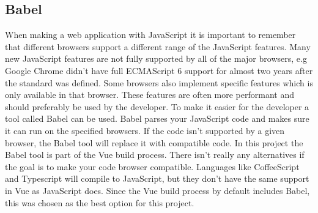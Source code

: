 \subsection{Babel}
When making a web application with JavaScript it is important to remember that different browsers support a different range of the JavaScript features. Many new JavaScript features are not fully supported by all of the major browsers, e.g Google Chrome didn't have full ECMAScript 6 support for almost two years after the standard was defined. Some browsers also implement specific features which is only available in that browser. These features are often more performant and should preferably be used by the developer. To make it easier for the developer a tool called Babel can be used. Babel parses your JavaScript code and makes sure it can run on the specified browsers. If the code isn't supported by a given browser, the Babel tool will replace it with compatible code. In this project the Babel tool is part of the Vue build process. There isn't really any alternatives if the goal is to make your code browser compatible. Languages like CoffeeScript and Typescript will compile to JavaScript, but they don't have the same support in Vue as JavaScript does. Since the Vue build process by default includes Babel, this was chosen as the best option for this project.
